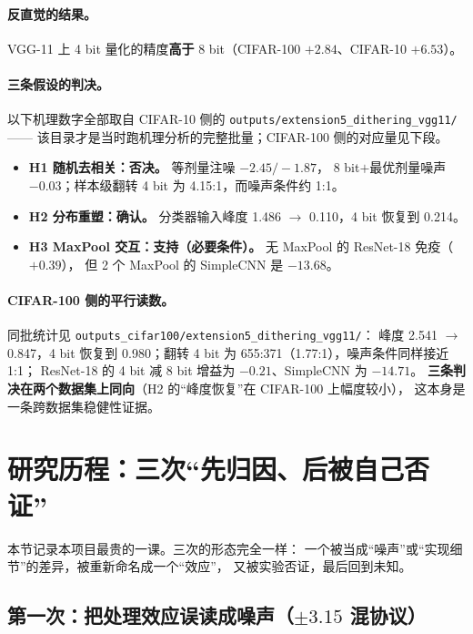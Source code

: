 \documentclass[11pt,a4paper]{ctexart}
\begin{document}
\paragraph{反直觉的结果。}
VGG-11 上 4 bit 量化的精度\textbf{高于} 8 bit（CIFAR-100 $+2.84$、CIFAR-10 $+6.53$）。

\paragraph{三条假设的判决。}
以下机理数字全部取自 CIFAR-10 侧的 \texttt{outputs/extension5\_dithering\_vgg11/}——
该目录才是当时跑机理分析的完整批量；CIFAR-100 侧的对应量见下段。
\begin{itemize}[leftmargin=2em,itemsep=2pt]
  \item \textbf{H1 随机去相关：否决。} 等剂量注噪 $-2.45/-1.87$，
        8 bit$+$最优剂量噪声 $-0.03$；样本级翻转 4 bit 为 4.15:1，而噪声条件约 1:1。
  \item \textbf{H2 分布重塑：确认。} 分类器输入峰度 1.486 $\to$ 0.110，4 bit 恢复到 0.214。
  \item \textbf{H3 MaxPool 交互：支持（必要条件）。} 无 MaxPool 的 ResNet-18 免疫（$+0.39$），
        但 2 个 MaxPool 的 SimpleCNN 是 $-13.68$。
\end{itemize}

\paragraph{CIFAR-100 侧的平行读数。}
同批统计见 \texttt{outputs\_cifar100/extension5\_dithering\_vgg11/}：
峰度 2.541 $\to$ 0.847，4 bit 恢复到 0.980；翻转 4 bit 为 655:371（1.77:1），噪声条件同样接近 1:1；
ResNet-18 的 4 bit 减 8 bit 增益为 $-0.21$、SimpleCNN 为 $-14.71$。
\textbf{三条判决在两个数据集上同向}（H2 的“峰度恢复”在 CIFAR-100 上幅度较小），
这本身是一条跨数据集稳健性证据。

\section{研究历程：三次“先归因、后被自己否证”}
\label{sec:history}

本节记录本项目最贵的一课。三次的形态完全一样：
一个被当成“噪声”或“实现细节”的差异，被重新命名成一个“效应”，
又被实验否证，最后回到未知。

\subsection{第一次：把处理效应误读成噪声（$\pm3.15$ 混协议）}
\end{document}
